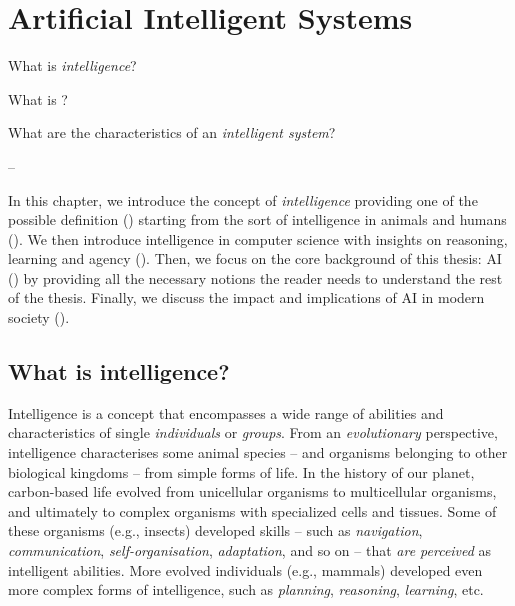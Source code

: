 
\chapter{Artificial Intelligent Systems}
\label{ch:intelligent-systems}

\begin{flushright}
\begin{minipage}{0.5\textwidth}
    What is \emph{intelligence}?

    What is \emph{}?

    What are the characteristics of an \emph{intelligent system}?

    -- \textbf{}
\end{minipage}
\end{flushright}

\mtcaddchapter
\minitoc


In this chapter, we introduce the concept of \emph{intelligence} providing one of the possible definition () starting from the sort of intelligence in animals and humans ().
%
We then introduce intelligence in computer science with insights on reasoning, learning and agency ().
%
Then, we focus on the core background of this thesis: \gls{AI} () by providing all the necessary notions the reader needs to understand the rest of the thesis.
%
Finally, we discuss the impact and implications of \gls{AI} in modern society ().


\section{What is intelligence?}\label{sec:what-is-intelligence}

Intelligence is a concept that encompasses a wide range of abilities and characteristics of single \emph{individuals} or \emph{groups}.
%
From an \emph{evolutionary} perspective, intelligence characterises some animal species -- and organisms belonging to other biological kingdoms -- from simple forms of life.
%
In the history of our planet, carbon-based life evolved from unicellular organisms to multicellular organisms, and ultimately to complex organisms with specialized cells and tissues.
%
Some of these organisms (e.g., insects) developed skills -- such as \emph{navigation}, \emph{communication}, \emph{self-organisation}, \emph{adaptation}, and so on -- that \emph{are perceived} as intelligent abilities.
%
More evolved individuals (e.g., mammals) developed even more complex forms of intelligence, such as \emph{planning}, \emph{reasoning}, \emph{learning}, etc.


